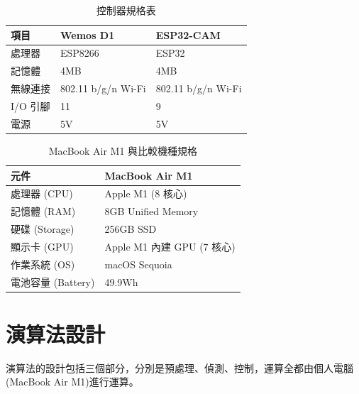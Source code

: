 \documentclass[12pt]{article}       %
\begin{document}
\begin{table}[H]
    \centering
    \caption{控制器規格表\cite{taiwaniot_WemosD1}\cite{ESP32CAM}}
    \vspace{6pt} %
    \label{tab:Wemos}
    \begin{tabular}{lll}
        \toprule
        \textbf{項目} & \textbf{Wemos D1} & \textbf{ESP32-CAM }\\
        \midrule
        處理器 & ESP8266 &ESP32\\
        記憶體 & 4MB  &4MB\\
        無線連接 & 802.11 b/g/n Wi-Fi& 802.11 b/g/n Wi-Fi\\
        I/O 引腳 & 11 &9\\
        電源 & 5V &5V\\
        \bottomrule
    \end{tabular}
\end{table}

\begin{table}[H]
    \centering
    \caption{MacBook Air M1 與比較機種規格}
    \vspace{6pt} %
    \label{tab:macbook_m1}
    \begin{tabular}{ll}
        \toprule
        \textbf{元件} & \textbf{MacBook Air M1} \\
        \midrule
        處理器 (CPU)  & Apple M1 (8 核心)  \\
        記憶體 (RAM)  & 8GB Unified Memory  \\
        硬碟 (Storage) & 256GB SSD  \\
        顯示卡 (GPU)  & Apple M1 內建 GPU (7 核心)  \\
        作業系統 (OS)  & macOS Sequoia \\
        電池容量 (Battery) & 49.9Wh \\
        \bottomrule
    \end{tabular}
\end{table}


\section{\centering 演算法設計}
\hspace{2em}演算法的設計包括三個部分，分別是預處理、偵測、控制，運算全都由個人電腦(MacBook Air M1)進行運算。
\end{document}
